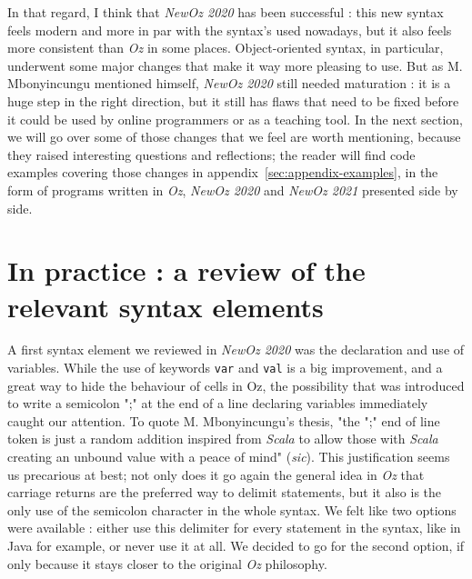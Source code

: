 In that regard, I think that \textit{NewOz 2020} has been successful : this new syntax feels modern and more in par with the syntax's used nowadays, but it also feels more consistent than \textit{Oz} in some places.
Object-oriented syntax, in particular, underwent some major changes that make it way more pleasing to use.
But as M. Mbonyincungu mentioned himself, \textit{NewOz 2020} still needed maturation : it is a huge step in the right direction, but it still has flaws that need to be fixed before it could be used by online programmers or as a teaching tool.
In the next section, we will go over some of those changes that we feel are worth mentioning, because they raised interesting questions and reflections;
the reader will find code examples covering those changes in appendix~\ref{sec:appendix-examples}, in the form of programs written in \textit{Oz}, \textit{NewOz 2020} and \textit{NewOz 2021} presented side by side.

\section{In practice : a review of the relevant syntax elements}\label{sec:ch2-review}
A first syntax element we reviewed in \textit{NewOz 2020} was the declaration and use of variables.
While the use of keywords \texttt{var} and \texttt{val} is a big improvement, and a great way to hide the behaviour of cells in Oz, the possibility that was introduced to write a semicolon ";" at the end of a line declaring variables immediately caught our attention.
To quote M. Mbonyincungu's thesis, "the ";" end of line token is just a random addition inspired from \textit{Scala} to allow those with \textit{Scala} creating an unbound value with a peace of mind" (\textit{sic}).
This justification seems us precarious at best;
not only does it go again the general idea in \textit{Oz} that carriage returns are the preferred way to delimit statements, but it also is the only use of the semicolon character in the whole syntax.
We felt like two options were available : either use this delimiter for every statement in the syntax, like in Java for example, or never use it at all.
We decided to go for the second option, if only because it stays closer to the original \textit{Oz} philosophy.\newline

